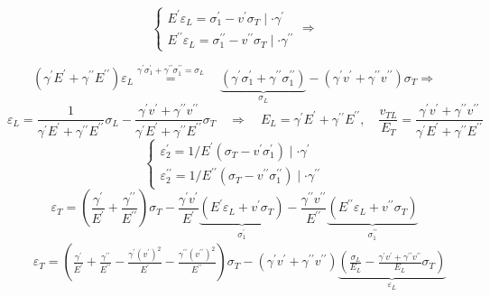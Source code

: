 $$
\left\{\begin{array}{l}
E^{\prime} \varepsilon_L=\sigma_1^{\prime}-v^{\prime} \sigma_T \mid \cdot \gamma^{\prime} \\
E^{\prime \prime} \varepsilon_L=\sigma_1^{\prime \prime}-v^{\prime \prime} \sigma_T \mid \cdot \gamma^{\prime \prime}
\end{array}\right. \Rightarrow$$

$$\left(\gamma^{\prime} E^{\prime}+\gamma^{\prime \prime} E^{\prime \prime}\right) \varepsilon_L \stackrel{{\gamma}^{\prime} \sigma_1^{\prime}+\gamma^{\prime \prime} \sigma_{1}^{\prime \prime}=\sigma_L}{=}
\quad \underbrace{\left(\gamma^{\prime} \sigma_1^{\prime}+\gamma^{\prime \prime} \sigma_1^{\prime \prime}\right)}\limits_{\sigma_L}-\left(\gamma^{\prime} v^{\prime}+\gamma^{\prime \prime} v^{\prime \prime}\right) \sigma_T \Rightarrow
$$
$$
\varepsilon_L=\frac{1}{\gamma^{\prime} E^{\prime}+\gamma^{\prime \prime} E^{\prime \prime}} \sigma_L-\frac{\gamma^{\prime} v^{\prime}+\gamma^{\prime \prime} v^{\prime \prime}}{\gamma^{\prime} E^{\prime}+\gamma^{\prime \prime} E^{\prime \prime}} \sigma_T \quad \Rightarrow \quad E_L=\gamma^{\prime} E^{\prime}+\gamma^{\prime \prime} E^{\prime \prime}, \quad \frac{v_{T L}}{E_T}=\frac{\gamma^{\prime} v^{\prime}+\gamma^{\prime \prime} v^{\prime \prime}}{\gamma^{\prime} E^{\prime}+\gamma^{\prime \prime} E^{\prime \prime}}
$$
$$
\left\{\begin{array}{l}
\varepsilon_2^{\prime}=1 / E^{\prime}\left(\sigma_T-v^{\prime} \sigma_1^{\prime}\right) \mid \cdot \gamma^{\prime} \\
\varepsilon_2^{\prime \prime}=1 / E^{\prime \prime}\left(\sigma_T-v^{\prime \prime} \sigma_1^{\prime \prime}\right) \mid \cdot \gamma^{\prime \prime}
\end{array}\right.$$
$$
\varepsilon_T=\left(\frac{\gamma^{\prime}}{E^{\prime}}+\frac{\gamma^{\prime \prime}}{E^{\prime \prime}}\right) \sigma_T-\frac{\gamma^{\prime} v^{\prime}}{E^{\prime}} \underbrace{\left(E^{\prime} \varepsilon_L+v^{\prime} \sigma_T\right)}_{\sigma_1^{\prime}}-\frac{\gamma^{\prime \prime} v^{\prime \prime}}{E^{\prime \prime}} \underbrace{\left(E^{\prime \prime} \varepsilon_L+v^{\prime \prime} \sigma_T\right)}_{\sigma_1^{\prime\prime}}
$$
$$
\begin{aligned}
& \varepsilon_T=\left(\frac{\gamma^{\prime}}{E^{\prime}}+\frac{\gamma^{\prime \prime}}{E^{\prime \prime}}-\frac{\gamma^{\prime}\left(v^{\prime}\right)^2}{E^{\prime}}-\frac{\gamma^{\prime \prime}\left(v^{\prime \prime}\right)^2}{E^{\prime \prime}}\right) \sigma_T-\left(\gamma^{\prime} v^{\prime}+\gamma^{\prime \prime} v^{\prime \prime}\right) \underbrace{\left(\frac{\sigma_L}{E_L}-\frac{\gamma^{\prime} v^{\prime}+\gamma^{\prime \prime} v^{\prime \prime}}{E_L} \sigma_T\right)} \limits_{\varepsilon_L} \\
\end{aligned}
$$
